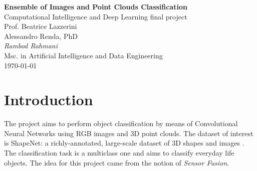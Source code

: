 \documentclass[11pt,a4paper]{article}
\begin{document}
\begin{center}
	\Large\textbf{Ensemble of Images and Point Clouds Classification}\\
	\vspace{0.2cm}
	\large{Computational Intelligence and Deep Learning final project}\\
	\large{Prof. Beatrice Lazzerini}\\
	\large{Alessandro Renda, PhD}\\
	\vspace{1.0cm}
	\large\textit{Rambod Rahmani}\\
	\vspace{0.2cm}
	\normalsize{Msc. in Artificial Intelligence and Data Engineering}\\
	\vspace{1.0cm}
	\today
\end{center}
\vspace{1cm}
\setcounter{tocdepth}{2}
\tableofcontents

\newpage
\section{Introduction}
The project aims to perform object classification by means of Convolutional Neural Networks using RGB images and 3D point clouds. The dataset of interest is ShapeNet: a richly-annotated, large-scale dataset of 3D shapes and images \cite{shapenet2015}.\\
The classification task is a multiclass one and aims to classify everyday life objects. The idea for this project came from the notion of \textit{Sensor Fusion}.
\end{document}
